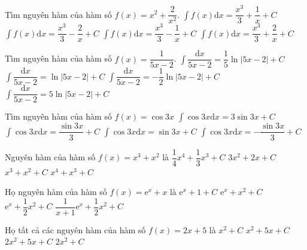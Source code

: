 \begin{ex}
	Tìm nguyên hàm của hàm số $ f(x)=x^2+\dfrac{2}{x^2}$.
	\choice
	{\True $\displaystyle\int{f(x)\mathrm{d}x}=\dfrac{x^3}{3}+\dfrac{1}{x}+C$}
	{$\displaystyle\int{f(x)\mathrm{d}x}=\dfrac{x^3}{3}-\dfrac{2}{x}+C$}
	{$\displaystyle\int{f(x)\mathrm{d}x}=\dfrac{x^3}{3}-\dfrac{1}{x}+C$}
	{$\displaystyle\int{f(x)\mathrm{d}x}=\dfrac{x^3}{3}+\dfrac{2}{x}+C$}
\end{ex}
\begin{ex}
	[Mã 110 2017]%
	Tìm nguyên hàm của hàm số $ f(x)=\dfrac{1}{5x-2}$.
	\choice
	{\True $\displaystyle\int{\dfrac{\mathrm{d}x}{5x-2}=\dfrac{1}{5}\ln \left| 5x-2\right|+C}$}
	{$\displaystyle\int{\dfrac{\mathrm{d}x}{5x-2}=\ln \left| 5x-2\right|+C}$}
	{$\displaystyle\int{\dfrac{\mathrm{d}x}{5x-2}=-\dfrac{1}{2}\ln \left| 5x-2\right|+C}$}
	{$\displaystyle\int{\dfrac{\mathrm{d}x}{5x-2}=5\ln \left| 5x-2\right|+C}$}
\end{ex}
\begin{ex}
	[Mã 123 2017]%
	Tìm nguyên hàm của hàm số $ f(x)=\cos 3x$
	\choice
	{$\displaystyle\int{\cos 3x\mathrm{d}x=3\sin 3x+C}$}
	{\True $\displaystyle\int{\cos 3x\mathrm{d}x=\dfrac{\sin 3x}{3}+C}$}
	{$\displaystyle\int{\cos 3x\mathrm{d}x=\sin 3x+C}$}
	{$\displaystyle\int{\cos 3x\mathrm{d}x=-\dfrac{\sin 3x}{3}+C}$}
\end{ex}
\begin{ex}
	[Mã 104 2018]%
	Nguyên hàm của hàm số $f(x)=x^3+x^2$ là
	\choice
	{\True $\dfrac{1}{4}{x^4}+\dfrac{1}{3}{x^3}+C$}
	{$3x^2+2x+C$}
	{$x^3+x^2+C$}
	{$x^4+x^3+C$}
	\loigiai{}
\end{ex}
\begin{ex}
	Họ nguyên hàm của hàm số $ f(x)=\mathrm{e}^x+x$ là
	\choice
	{$\mathrm{e}^x+1+C$}
	{$\mathrm{e}^x+x^2+C$}
	{\True $\mathrm{e}^x+\dfrac{1}{2}{x^2}+C$}
	{$\dfrac{1}{x+1}{\mathrm{e}^x}+\dfrac{1}{2}{x^2}+C$}
	\loigiai{}
\end{ex}
\begin{ex}
	[Mã 101 - 2019]%
	Họ tất cả các nguyên hàm của hàm số $ f(x)=2x+5$ là
	\choice
	{$x^2+C$}
	{\True $x^2+5x+C$}
	{$ 2x^2+5x+C$}
	{$ 2x^2+C$}
\end{ex}
